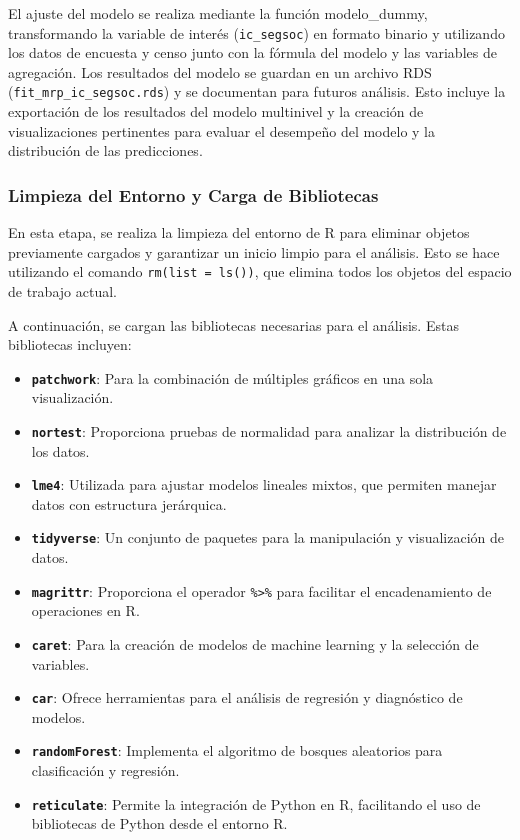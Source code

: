 \documentclass[
  12pt,
]{book}
\providecommand{\tightlist}{%
  \setlength{\itemsep}{0pt}\setlength{\parskip}{0pt}}
\begin{document}
El ajuste del modelo se realiza mediante la función modelo\_dummy, transformando la variable de interés (\texttt{ic\_segsoc}) en formato binario y utilizando los datos de encuesta y censo junto con la fórmula del modelo y las variables de agregación. Los resultados del modelo se guardan en un archivo RDS (\texttt{fit\_mrp\_ic\_segsoc.rds}) y se documentan para futuros análisis. Esto incluye la exportación de los resultados del modelo multinivel y la creación de visualizaciones pertinentes para evaluar el desempeño del modelo y la distribución de las predicciones.

\hypertarget{limpieza-del-entorno-y-carga-de-bibliotecas-5}{%
\subsubsection*{Limpieza del Entorno y Carga de Bibliotecas}\label{limpieza-del-entorno-y-carga-de-bibliotecas-5}}

En esta etapa, se realiza la limpieza del entorno de R para eliminar objetos previamente cargados y garantizar un inicio limpio para el análisis. Esto se hace utilizando el comando \texttt{rm(list\ =\ ls())}, que elimina todos los objetos del espacio de trabajo actual.

A continuación, se cargan las bibliotecas necesarias para el análisis. Estas bibliotecas incluyen:

\begin{itemize}
\tightlist
\item
  \textbf{\texttt{patchwork}}: Para la combinación de múltiples gráficos en una sola visualización.
\item
  \textbf{\texttt{nortest}}: Proporciona pruebas de normalidad para analizar la distribución de los datos.
\item
  \textbf{\texttt{lme4}}: Utilizada para ajustar modelos lineales mixtos, que permiten manejar datos con estructura jerárquica.
\item
  \textbf{\texttt{tidyverse}}: Un conjunto de paquetes para la manipulación y visualización de datos.
\item
  \textbf{\texttt{magrittr}}: Proporciona el operador \texttt{\%\textgreater{}\%} para facilitar el encadenamiento de operaciones en R.
\item
  \textbf{\texttt{caret}}: Para la creación de modelos de machine learning y la selección de variables.
\item
  \textbf{\texttt{car}}: Ofrece herramientas para el análisis de regresión y diagnóstico de modelos.
\item
  \textbf{\texttt{randomForest}}: Implementa el algoritmo de bosques aleatorios para clasificación y regresión.
\item
  \textbf{\texttt{reticulate}}: Permite la integración de Python en R, facilitando el uso de bibliotecas de Python desde el entorno R.
\end{itemize}
\end{document}

